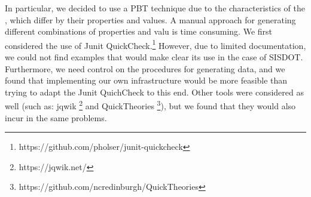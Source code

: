   




In particular, we decided to use a PBT technique due to the characteristics of the \callers,
which differ by their properties and values. A manual approach for generating different combinations
of properties and valu is time consuming. We first considered the use of Junit QuickCheck.\footnote{https://github.com/pholser/junit-quickcheck} However, due to limited documentation, we could not find examples that would make clear its use in the case of SISDOT.
Furthermore, we need control on the procedures for generating data,
and we found that implementing
our own infrastructure would be more feasible than trying to adapt the Junit QuichCheck to this end. Other tools were considered as well
(such as: jqwik \footnote{https://jqwik.net/} and QuickTheories \footnote{https://github.com/ncredinburgh/QuickTheories}),
but we found that they would also incur in the same problems.

